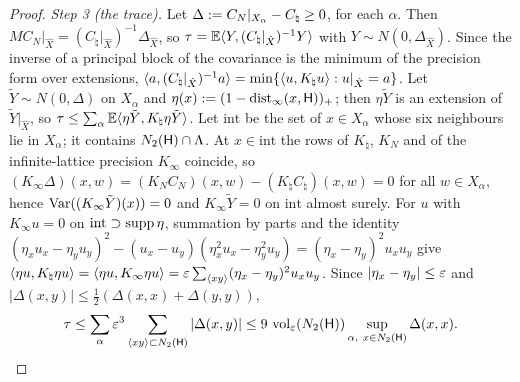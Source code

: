 \begin{proof}
\emph{Step 3 (the trace).} Let $\Delta:= C_N|_{X_\alpha}-C_\natural\ge0$, for each $\alpha$. Then $MC_N|_{\hat X}=(C_\natural|_{\hat X})^{-1}\Delta_{\hat X}$, so $\tau=\mathbb E\langle Y,(C_\natural|_{\hat X})^{-1}Y\rangle$ with $Y\sim N(0,\Delta_{\hat X})$. Since the inverse of a principal block of the covariance is the minimum of the precision form over extensions, $\langle a,(C_\natural|_{\hat X})^{-1}a\rangle=\min\{\langle u,K_\natural u\rangle:u|_{\hat X}=a\}$. Let $\tilde Y\sim N(0,\Delta)$ on $X_\alpha$ and $\eta(x):=(1-\operatorname{dist}_\infty(x,\mathsf H))_+$; then $\eta\tilde Y$ is an extension of $\tilde Y|_{\hat X}$, so $\tau\le\sum_\alpha\mathbb E\langle \eta\tilde Y,K_\natural\eta\tilde Y\rangle$. Let $\mathrm{int}$ be the set of $x\in X_\alpha$ whose six neighbours lie in $X_\alpha$; it contains $N_{2}(\mathsf H)\cap\Lambda$. At $x\in\mathrm{int}$ the rows of $K_\natural$, $K_N$ and of the infinite-lattice precision $K_\infty$ coincide, so $(K_\infty\Delta)(x,w)=(K_NC_N)(x,w)-(K_\natural C_\natural)(x,w)=0$ for all $w\in X_\alpha$, hence $\operatorname{Var}((K_\infty\tilde Y)(x))=0$ and $K_\infty\tilde Y=0$ on $\mathrm{int}$ almost surely. For $u$ with $K_\infty u=0$ on $\mathrm{int}\supset\operatorname{supp}\eta$, summation by parts and the identity $(\eta_xu_x-\eta_yu_y)^2-(u_x-u_y)(\eta_x^2u_x-\eta_y^2u_y)=(\eta_x-\eta_y)^2u_xu_y$ give $\langle \eta u,K_\natural\eta u\rangle=\langle \eta u,K_\infty\eta u\rangle=\varepsilon\sum_{\langle xy\rangle}(\eta_x-\eta_y)^2u_xu_y$. Since $|\eta_x-\eta_y|\le\varepsilon$ and $|\Delta(x,y)|\le\frac12(\Delta(x,x)+\Delta(y,y))$,
\[
\tau\le\sum_\alpha\eps^3\sum_{\langle xy\rangle\subset\Nr2{\Hbox}}|\Delta(x,y)|\le9\,\vol_\eps(\Nr2{\Hbox})\sup_{\alpha,\ x\in\Nr2{\Hbox}}\Delta(x,x).
\]


\end{proof}
